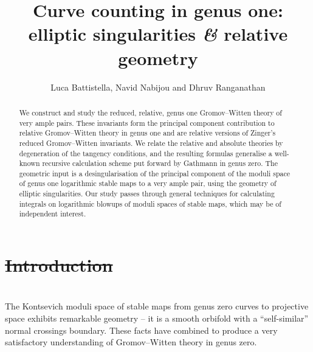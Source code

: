 \documentclass[11pt]{amsart}
\title[Curve counting in genus one: elliptic singularities {\it \&}  relative geometry]{Curve counting in genus one: \DIFaddbegin \\ \DIFaddend elliptic singularities {\it \&} relative geometry}
\author{Luca Battistella, Navid Nabijou and Dhruv Ranganathan}
\theoremstyle{definition}
\theoremstyle{definition}
\providecommand{\DIFaddtex}[1]{{\protect\color{blue}\uwave{#1}}} %
\providecommand{\DIFdeltex}[1]{{\protect\color{red}\sout{#1}}}                      %
\providecommand{\DIFaddbegin}{} %
\providecommand{\DIFaddend}{} %
\providecommand{\DIFdelbegin}{} %
\providecommand{\DIFdelend}{} %
\providecommand{\DIFadd}[1]{\texorpdfstring{\DIFaddtex{#1}}{#1}} %
\providecommand{\DIFdel}[1]{\texorpdfstring{\DIFdeltex{#1}}{}} %
\begin{document}
\begin{abstract}
We construct and study the reduced, relative, genus one Gromov--Witten theory of very ample pairs. These invariants form the principal component contribution to relative Gromov--Witten theory in genus one and are relative versions of Zinger's reduced Gromov--Witten invariants. We relate the relative and absolute theories by degeneration of the tangency conditions, and the resulting formulas generalise a well-known recursive calculation scheme put forward by Gathmann in genus zero. The geometric input is a desingularisation of the principal component of the moduli space of genus one logarithmic stable maps to a very ample pair, using the geometry of elliptic singularities. Our study passes through general techniques for calculating integrals on logarithmic blowups of moduli spaces of stable maps, which may be of independent interest.
\end{abstract}

\maketitle

\appendixtitletocoff
\tableofcontents

\DIFdelbegin %
\section{\DIFdel{Introduction}}
\addtocounter{section}{-1}%
\DIFdelend \DIFaddbegin \setcounter{section}{0}

\section*{\DIFadd{Introduction}}
\DIFaddend 

The Kontsevich moduli space of stable maps from genus zero curves to projective space exhibits remarkable geometry -- it is a smooth orbifold with a ``self-similar'' normal crossings boundary. These facts have combined to produce a very {satisfactory} understanding of Gromov--Witten theory in genus zero. 
\end{document}
